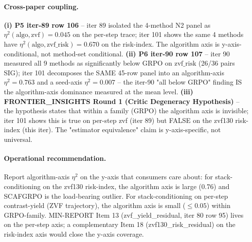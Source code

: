 \paragraph{Cross-paper coupling.}
\textbf{(i) P5 iter-89 row 106} -- iter 89 isolated the 4-method
N2 panel as $\eta^2(\mathrm{algo}, \mathrm{zvf}) = 0.045$ on the
per-step trace; iter 101 shows the same 4 methods have
$\eta^2(\mathrm{algo}, \mathrm{zvf\_risk}) = 0.670$ on the
risk-index. The algorithm axis is y-axis-conditional, not method-set
conditional. \textbf{(ii) P6 iter-90 row 107} -- iter 90 measured
all 9 methods as significantly below GRPO on $\mathrm{zvf\_risk}$
(26/36 pairs SIG); iter 101 decomposes the SAME 45-row panel
into an algorithm-axis $\eta^2 = 0.763$ and a seed-axis
$\eta^2 = 0.007$ -- the iter-90 "all below GRPO" finding IS the
algorithm-axis dominance measured at the mean level. \textbf{(iii)
FRONTIER\_INSIGHTS Round 1 (Critic Degeneracy Hypothesis)} -- the
hypothesis states that within a family (GRPO) the algorithm axis
is invisible; iter 101 shows this is true on per-step zvf (iter
89) but FALSE on the zvf130 risk-index (this iter). The
"estimator equivalence" claim is y-axis-specific, not universal.

\paragraph{Operational recommendation.}
Report algorithm-axis $\eta^2$ on the y-axis that consumers
care about: for stack-conditioning on the zvf130 risk-index,
the algorithm axis is large (0.76) and SCAFGRPO is the
load-bearing outlier. For stack-conditioning on per-step
contrast-yield (ZVF trajectory), the algorithm axis is small
($\leq 0.05$) within GRPO-family. MIN-REPORT Item 13
(zvf\_yield\_residual, iter 80 row 95) lives on the per-step
axis; a complementary Item 18 (zvf130\_risk\_residual) on the
risk-index axis would close the y-axis coverage.

%
